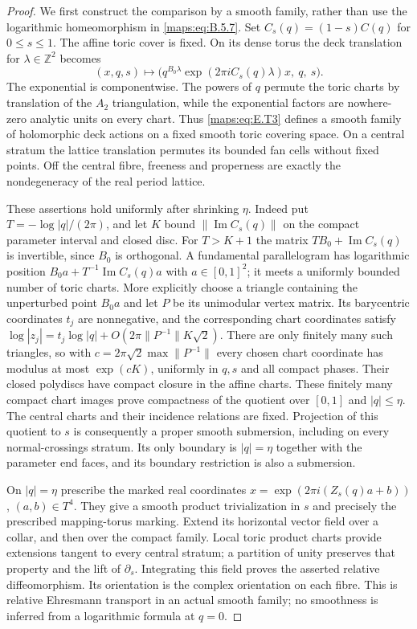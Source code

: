 \begin{proof}
We first construct the comparison by a smooth family, rather
than use the logarithmic homeomorphism in \eqref{maps:eq:B.5.7}.  Set
$C_s(q)=(1-s)C(q)$ for $0\leq s\leq1$.  The affine toric cover
is fixed.  On its dense torus the deck translation for
$\lambda\in\mathbb Z^2$ becomes
\[
 (x,q,s)\longmapsto
 \bigl(q^{B_0\lambda}
       \exp(2\pi i C_s(q)\lambda)x,\ q,\ s\bigr).
 \tag{E.T3}\label{maps:eq:E.T3}
\]
The exponential is componentwise.  The powers of $q$ permute
the toric charts by translation of the $A_2$ triangulation,
while the exponential factors are nowhere-zero analytic units
on every chart.  Thus \eqref{maps:eq:E.T3} defines a smooth family of
holomorphic deck actions on a fixed smooth toric covering
space.  On a central stratum the lattice translation permutes
its bounded fan cells without fixed points.  Off the central
fibre, freeness and properness are exactly the nondegeneracy
of the real period lattice.

These assertions hold uniformly after shrinking $\eta$.
Indeed put $T=-\log|q|/(2\pi)$, and let $K$ bound
$\|\operatorname{Im}C_s(q)\|$ on the compact parameter interval
and closed disc.  For $T>K+1$ the matrix
$TB_0+\operatorname{Im}C_s(q)$ is invertible, since $B_0$ is
orthogonal.  A fundamental parallelogram has logarithmic
position
$B_0a+T^{-1}\operatorname{Im}C_s(q)a$ with
$a\in[0,1]^2$; it meets a uniformly bounded number of toric
charts.  More explicitly choose a triangle containing the
unperturbed point $B_0a$ and let $P$ be its unimodular vertex
matrix.  Its barycentric coordinates $t_j$ are nonnegative,
and the corresponding chart coordinates satisfy
$\log|z_j|=t_j\log|q|+
O(2\pi\|P^{-1}\|K\sqrt2)$.
There are only finitely many such triangles, so with
$c=2\pi\sqrt2\max\|P^{-1}\|$ every chosen chart coordinate
has modulus at most $\exp(cK)$, uniformly in $q,s$ and
all compact phases.  Their closed polydiscs have compact
closure in the affine charts.  These finitely many compact
chart images prove
compactness of the quotient over $[0,1]$ and $|q|\leq\eta$.
The central charts and their incidence relations are fixed.
Projection of this quotient to $s$ is consequently a proper
smooth submersion, including on every normal-crossings stratum.
Its only boundary is $|q|=\eta$ together with the parameter
end faces, and its boundary restriction is also a submersion.

On $|q|=\eta$ prescribe the marked real coordinates
$x=\exp(2\pi i(Z_s(q)a+b))$, $(a,b)\in T^4$.
They give a smooth product trivialization in $s$ and precisely
the prescribed mapping-torus marking.  Extend its horizontal
vector field over a collar, and then over the compact family.
Local toric product charts provide extensions tangent to
every central stratum; a partition of unity preserves that
property and the lift of $\partial_s$.  Integrating this
field proves the asserted relative diffeomorphism.  Its
orientation is the complex orientation on each fibre.
This is relative Ehresmann transport in an actual smooth
family; no smoothness is inferred from a logarithmic formula
at $q=0$.


\end{proof}
